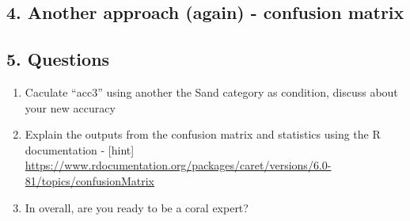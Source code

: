 \documentclass[]{article}
\providecommand{\tightlist}{%
  \setlength{\itemsep}{0pt}\setlength{\parskip}{0pt}}
\begin{document}
\subsection{4. Another approach (again) - confusion
matrix}\label{another-approach-again---confusion-matrix}

\subsection{5. Questions}\label{questions}

\begin{enumerate}
\def\labelenumi{\arabic{enumi}.}
\tightlist
\item
  Caculate ``acc3'' using another the Sand category as condition,
  discuss about your new accuracy
\item
  Explain the outputs from the confusion matrix and statistics using the
  R documentation - {[}hint{]}
  \url{https://www.rdocumentation.org/packages/caret/versions/6.0-81/topics/confusionMatrix}
\item
  In overall, are you ready to be a coral expert?
\end{enumerate}
\end{document}
